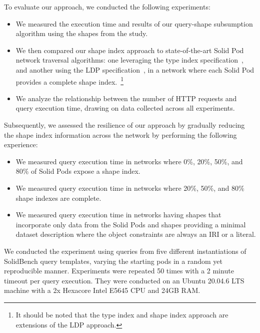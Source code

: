 To evaluate our approach, we conducted the following experiments: 
\begin{itemize}
   \item We measured the execution time and results of our query-shape subsumption algorithm using the shapes from the study.
   \item We then compared our shape index approach to state-of-the-art Solid Pod network traversal algorithms: one leveraging the type index specification~\cite{Taelman2023}, and another using the LDP specification~\cite{Taelman2023}, in a network where each Solid Pod provides a complete shape index.~\footnote{It should be noted that the type index and shape index approach are extensions of the LDP approach.}
   \item We analyze the relationship between the number of HTTP requests and query execution time, drawing on data collected across all experiments.
\end{itemize}

Subsequently, we assessed the resilience of our approach by gradually reducing the shape index information across the network by performing the following experience:

\begin{itemize}
   \item We measured query execution time in networks where 0\%, 20\%, 50\%, and 80\% of Solid Pods expose a shape index.
   \item We measured query execution time in networks where 20\%, 50\%, and 80\% shape indexes are complete.
   \item We measured query execution time in networks having shapes that incorporate only data from the Solid Pods and shapes providing a minimal dataset description where the object constraints are always an IRI or a literal.
\end{itemize}

We conducted the experiment using queries from five different instantiations of SolidBench query templates, varying the starting pods in a random yet reproducible manner.
Experiments were repeated 50 times with a 2 minute timeout per query execution. 
They were conducted on an Ubuntu 20.04.6 LTS machine with a 2x Hexacore Intel E5645 CPU and 24GB RAM.


